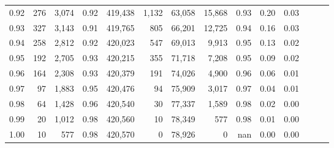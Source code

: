 \begin{tabular}{rrrrrrrrrrrrrr}
0.92 &    276 &  3,074 &  0.92 &  419,438 &    1,132 &  63,058 &  15,868 &  0.93 &  0.20 &      0.03 \\
0.93 &    327 &  3,143 &  0.91 &  419,765 &      805 &  66,201 &  12,725 &  0.94 &  0.16 &      0.03 \\
0.94 &    258 &  2,812 &  0.92 &  420,023 &      547 &  69,013 &   9,913 &  0.95 &  0.13 &      0.02 \\
0.95 &    192 &  2,705 &  0.93 &  420,215 &      355 &  71,718 &   7,208 &  0.95 &  0.09 &      0.02 \\
0.96 &    164 &  2,308 &  0.93 &  420,379 &      191 &  74,026 &   4,900 &  0.96 &  0.06 &      0.01 \\
0.97 &     97 &  1,883 &  0.95 &  420,476 &       94 &  75,909 &   3,017 &  0.97 &  0.04 &      0.01 \\
0.98 &     64 &  1,428 &  0.96 &  420,540 &       30 &  77,337 &   1,589 &  0.98 &  0.02 &      0.00 \\
0.99 &     20 &  1,012 &  0.98 &  420,560 &       10 &  78,349 &     577 &  0.98 &  0.01 &      0.00 \\
1.00 &     10 &    577 &  0.98 &  420,570 &        0 &  78,926 &       0 &   nan &  0.00 &      0.00 \\
\bottomrule
\end{tabular}
